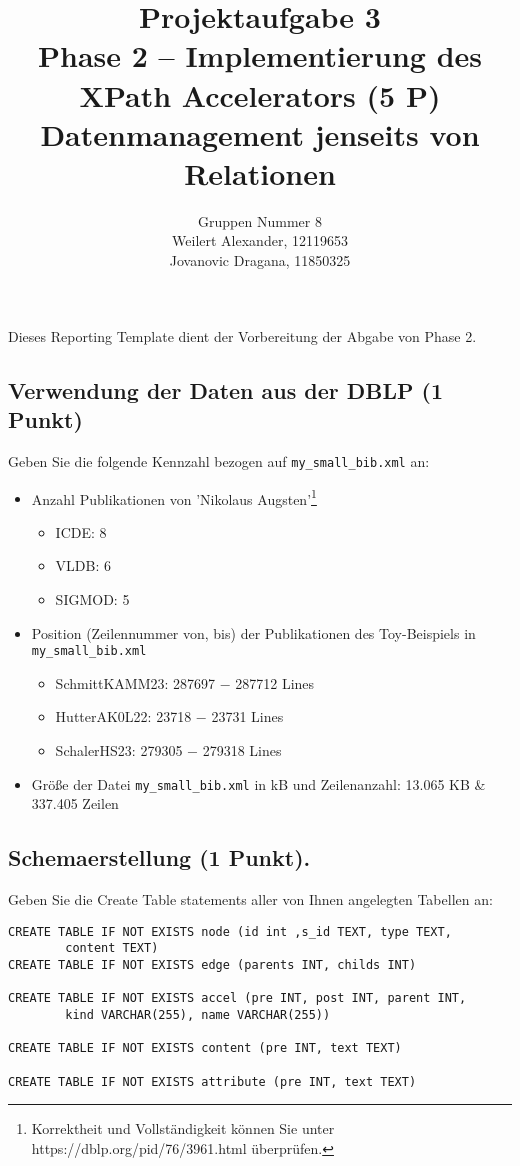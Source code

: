 \documentclass[11pt]{scrartcl}
\title{
  \textbf{\large Projektaufgabe 3 } \\
  Phase 2 – Implementierung des XPath Accelerators (5 P) \\
  {\large Datenmanagement jenseits von Relationen}
}
\author{
	Gruppen Nummer 8 \\
	\large Weilert Alexander, 12119653 \\
	\large Jovanovic Dragana, 11850325
}
\begin{document}
\maketitle\thispagestyle{empty}

Dieses Reporting Template dient der Vorbereitung der Abgabe von Phase 2.

\subsection*{Verwendung der Daten aus der DBLP (1 Punkt)}

Geben Sie die folgende Kennzahl bezogen auf \texttt{my\_small\_bib.xml} an:

\begin{itemize}
	\item Anzahl Publikationen von 'Nikolaus Augsten'\footnote{Korrektheit und Vollständigkeit können Sie unter https://dblp.org/pid/76/3961.html überprüfen.}
		\begin{itemize}
		\item ICDE: 8
		\item VLDB: 6
		\item SIGMOD: 5
	\end{itemize}
	\item Position (Zeilennummer von, bis) der Publikationen des Toy-Beispiels in \texttt{my\_small\_bib.xml}
	
	\begin{itemize}
		\item SchmittKAMM23: 287697 $-$ 287712 Lines
		\item HutterAK0L22: 23718 $-$ 23731 Lines
		\item SchalerHS23: 279305 $-$ 279318 Lines
	\end{itemize}
	\item Größe der Datei \texttt{my\_small\_bib.xml} in kB und Zeilenanzahl: 13.065 KB \& 337.405 Zeilen
\end{itemize}



\subsection*{Schemaerstellung (1 Punkt).}
Geben Sie die Create Table statements aller von Ihnen angelegten Tabellen an:
\begin{lstlisting}[style=dmrsql]
CREATE TABLE IF NOT EXISTS node (id int ,s_id TEXT, type TEXT,
		content TEXT)
CREATE TABLE IF NOT EXISTS edge (parents INT, childs INT)

CREATE TABLE IF NOT EXISTS accel (pre INT, post INT, parent INT,
		kind VARCHAR(255), name VARCHAR(255))

CREATE TABLE IF NOT EXISTS content (pre INT, text TEXT)

CREATE TABLE IF NOT EXISTS attribute (pre INT, text TEXT)
\end{lstlisting}
\end{document}
